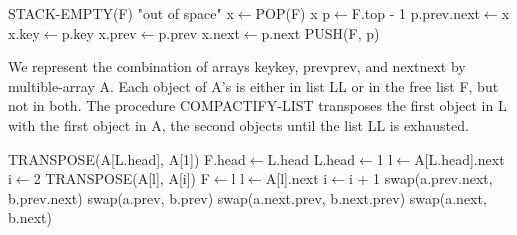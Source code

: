 \documentclass[a4paper, justified]{tufte-handout}
\begin{document}
\begin{problem}[TC 10.3-4]
\end{problem}

\begin{solution}
  \begin{algorithm}
    \begin{algorithmic}[3]
      \If STACK-EMPTY(F)
      \Return "out of space"
      \Else
      \State x$\gets$POP(F)
      \Return x
      \EndIf
      \EndProcedure
      \State p$\gets$F.top - 1
      \State p.prev.next$\gets$x
      \State x.key$\gets$p.key
      \State x.prev$\gets$p.prev
      \State x.next$\gets$p.next
      \State PUSH(F, p)
      \EndProcedure
    \end{algorithmic}
  \end{algorithm}
\end{solution}

\begin{problem}[TC 10.3-5]
\end{problem}

\begin{solution}
  We represent the combination of arrays keykey, prevprev, and nextnext by multible-array A. Each object of A's is either in list LL or in the free list F, but not in both. The procedure COMPACTIFY-LIST transposes the first object in L with the first object in A, the second objects until the list LL is exhausted.
  \begin{algorithm}
    \begin{algorithmic}[4]
      \State TRANSPOSE(A[L.head], A[1])
      \State F.head$\gets$L.head
      \EndIf
      \State L.head$\gets$1
      \State l$\gets$A[L.head].next
      \State i$\gets$2
      \State TRANSPOSE(A[l], A[i])
      \State F$\gets$l
      \EndIf
      \State l$\gets$A[l].next
      \State i$\gets$i + 1
      \EndWhile
      \EndProcedure
      \State swap(a.prev.next, b.prev.next)
      \State swap(a.prev, b.prev)
      \State swap(a.next.prev, b.next.prev)
      \State swap(a.next, b.next)
      \EndProcedure
    \end{algorithmic}
  \end{algorithm}
\end{solution}

\begin{problem}[TC 10.4-2]
\end{problem}
\end{document}
